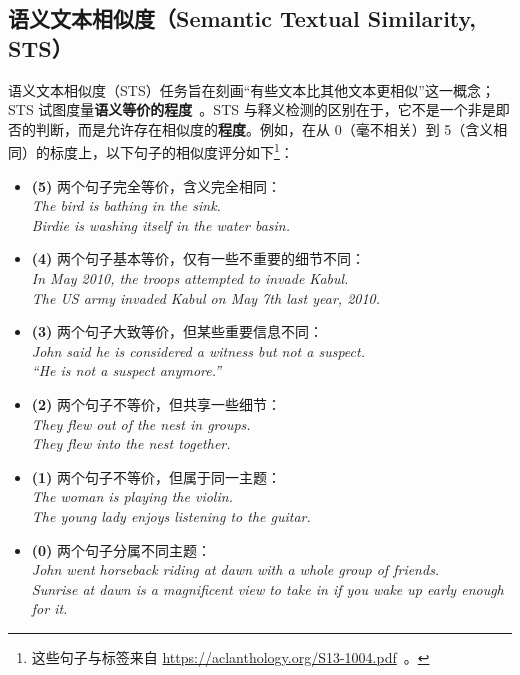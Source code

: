 \documentclass[11pt]{article}
\begin{document}
\subsection{语义文本相似度（Semantic Textual Similarity, STS）}

语义文本相似度（STS）任务旨在刻画``有些文本比其他文本更相似''这一概念；STS 试图度量\textbf{语义等价的程度}~\cite{agirre2013sem}。STS 与释义检测的区别在于，它不是一个非是即否的判断，而是允许存在相似度的\textbf{程度}。例如，在从 0（毫不相关）到 5（含义相同）的标度上，以下句子的相似度评分如下\footnote{这些句子与标签来自 \url{https://aclanthology.org/S13-1004.pdf}~\cite{agirre2013sem}。}：

\begin{itemize}[leftmargin=2em]
  \item \textbf{(5)} 两个句子完全等价，含义完全相同：\\
        \textit{The bird is bathing in the sink.}\\
        \textit{Birdie is washing itself in the water basin.}
  \item \textbf{(4)} 两个句子基本等价，仅有一些不重要的细节不同：\\
        \textit{In May 2010, the troops attempted to invade Kabul.}\\
        \textit{The US army invaded Kabul on May 7th last year, 2010.}
  \item \textbf{(3)} 两个句子大致等价，但某些重要信息不同：\\
        \textit{John said he is considered a witness but not a suspect.}\\
        \textit{``He is not a suspect anymore.''}
  \item \textbf{(2)} 两个句子不等价，但共享一些细节：\\
        \textit{They flew out of the nest in groups.}\\
        \textit{They flew into the nest together.}
  \item \textbf{(1)} 两个句子不等价，但属于同一主题：\\
        \textit{The woman is playing the violin.}\\
        \textit{The young lady enjoys listening to the guitar.}
  \item \textbf{(0)} 两个句子分属不同主题：\\
        \textit{John went horseback riding at dawn with a whole group of friends.}\\
        \textit{Sunrise at dawn is a magnificent view to take in if you wake up early enough for it.}
\end{itemize}
\end{document}
